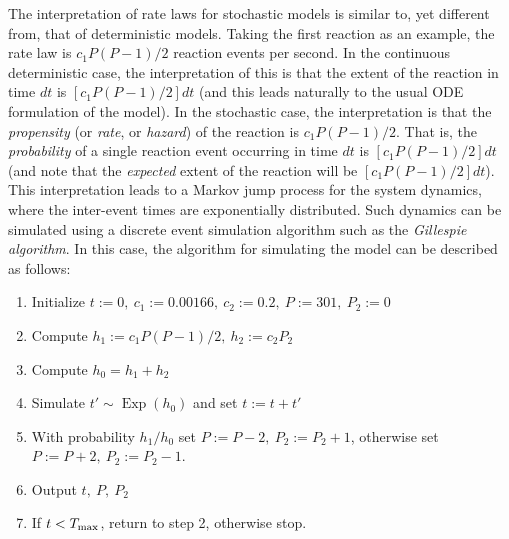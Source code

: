 \clearpage 

The interpretation of rate laws for stochastic models is similar
to, yet different from, that of deterministic models. Taking the
first reaction as an example, the rate law is $c_1P(P-1)/2$ reaction
events per second. In the continuous deterministic case, the
interpretation of this is that the extent of the reaction in time
$dt$ is $[c_1P(P-1)/2]dt$ (and this leads naturally to the usual ODE
formulation of the model). In the stochastic case, the
interpretation is that the \emph{propensity} (or \emph{rate}, or
\emph{hazard}) of the reaction is $c_1P(P-1)/2$. That is, the
\emph{probability} of a single reaction event occurring in time
$dt$ is $[c_1P(P-1)/2]dt$ (and note that the \emph{expected} extent of
the reaction will be $[c_1P(P-1)/2]dt$). This interpretation leads to a Markov
jump process for the system dynamics, where the inter-event times
are exponentially distributed. Such dynamics can be simulated
using a discrete event simulation algorithm such as the
\emph{Gillespie algorithm}. In this case, the algorithm for
simulating the model can be described as follows:

\begin{enumerate}

\item Initialize $t:=0,\ c_1:=0.00166,\ c_2:=0.2,\ P:=301,\ P_2:=0$

\item Compute $h_1:=c_1P(P-1)/2,\ h_2:=c_2P_2$

\item Compute $h_0=h_1+h_2$

\item Simulate $t'\sim \operatorname{Exp}(h_0)$ and set $t:=t+t'$

\item With probability $h_1/h_0$ set $P:=P-2,\ P_2:=P_2+1$,
  otherwise set $P:=P+2,\ P_2:=P_2-1$.

\item Output $t,\ P,\ P_2$

\item If $t<T\sub{max}$, return to step 2, otherwise stop.

\end{enumerate}

